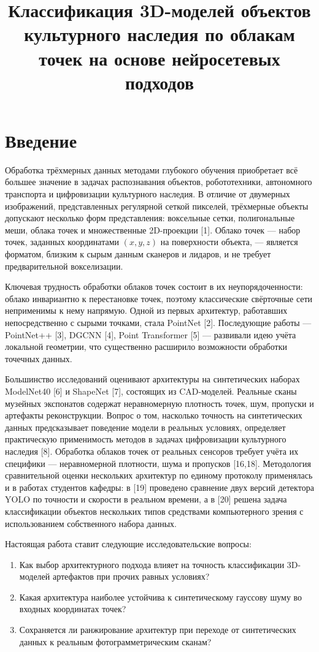 \documentclass{misisarticle}
\title{Классификация 3D-моделей объектов культурного наследия по облакам точек на основе нейросетевых подходов}
\begin{document}
\maketitle

\section{Введение}

Обработка трёхмерных данных методами глубокого обучения приобретает всё большее значение в задачах распознавания объектов, робототехники, автономного транспорта и цифровизации культурного наследия. В отличие от двумерных изображений, представленных регулярной сеткой пикселей, трёхмерные объекты допускают несколько форм представления: воксельные сетки, полигональные меши, облака точек и множественные 2D-проекции [1]. Облако точек — набор точек, заданных координатами $(x,y,z)$ на поверхности объекта, — является форматом, близким к сырым данным сканеров и лидаров, и не требует предварительной вокселизации.

Ключевая трудность обработки облаков точек состоит в их неупорядоченности: облако инвариантно к перестановке точек, поэтому классические свёрточные сети неприменимы к нему напрямую. Одной из первых архитектур, работавших непосредственно с сырыми точками, стала PointNet [2]. Последующие работы — PointNet++ [3], DGCNN [4], Point Transformer [5] — развивали идею учёта локальной геометрии, что существенно расширило возможности обработки точечных данных.

Большинство исследований оценивают архитектуры на синтетических наборах ModelNet40 [6] и ShapeNet [7], состоящих из CAD-моделей. Реальные сканы музейных экспонатов содержат неравномерную плотность точек, шум, пропуски и артефакты реконструкции. Вопрос о том, насколько точность на синтетических данных предсказывает поведение модели в реальных условиях, определяет практическую применимость методов в задачах цифровизации культурного наследия [8]. Обработка облаков точек от реальных сенсоров требует учёта их специфики — неравномерной плотности, шума и пропусков [16,18]. Методология сравнительной оценки нескольких архитектур по единому протоколу применялась и в работах студентов кафедры: в [19] проведено сравнение двух версий детектора YOLO по точности и скорости в реальном времени, а в [20] решена задача классификации объектов нескольких типов средствами компьютерного зрения с использованием собственного набора данных.

Настоящая работа ставит следующие исследовательские вопросы:
\begin{enumerate}
  \item Как выбор архитектурного подхода влияет на точность классификации 3D-моделей артефактов при прочих равных условиях?
  \item Какая архитектура наиболее устойчива к синтетическому гауссову шуму во входных координатах точек?
  \item Сохраняется ли ранжирование архитектур при переходе от синтетических данных к реальным фотограмметрическим сканам?
\end{enumerate}
\end{document}
